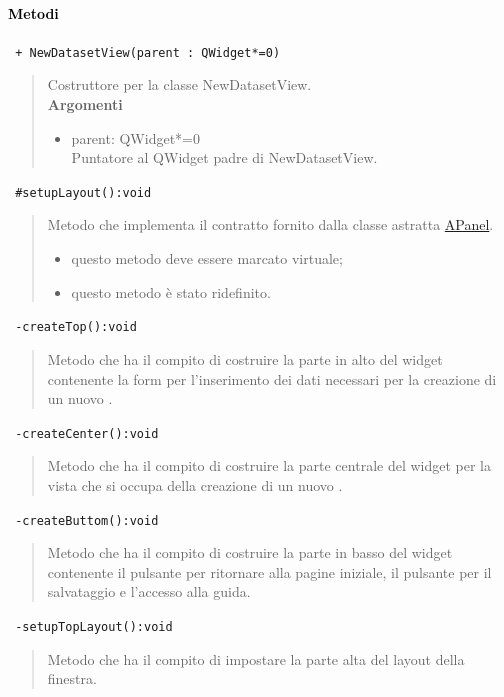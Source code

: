\paragraph{\textcolor{black}{Metodi\\}}
\color{blue}\verb! + NewDatasetView(parent : QWidget*=0)!
\begin{quote}
\color{black}Costruttore per la classe NewDatasetView. \\
\textbf{Argomenti}
\begin{itemize}
\item parent: QWidget*=0  \\ Puntatore al QWidget padre di NewDatasetView.
\end{itemize}
\end{quote}
\color{blue}\verb! #setupLayout():void!
\begin{quote}
\color{black} Metodo che implementa il contratto fornito dalla classe astratta \hyperref[speAPanel]{APanel}.
\begin{itemize}
\item questo metodo deve essere marcato virtuale;
\item questo metodo è stato ridefinito.
\end{itemize}
\end{quote} 
\color{blue}\verb! -createTop():void!
\begin{quote}
\color{black} Metodo che ha il compito di costruire la parte in alto del widget contenente la form per l'inserimento dei dati necessari per la creazione di un nuovo \dataset{}.
\end{quote} 
\color{blue}\verb! -createCenter():void!
\begin{quote}
\color{black} Metodo che ha il compito di costruire la parte centrale del widget per la vista che si occupa della  creazione di un nuovo \dataset{}.
\end{quote} 
\color{blue}\verb! -createButtom():void!
\begin{quote}
\color{black} Metodo che ha il compito di costruire la parte in basso del widget contenente il pulsante per ritornare alla pagine iniziale, il pulsante per il salvataggio e l'accesso alla guida.
\end{quote}
\color{blue}\verb! -setupTopLayout():void!
\begin{quote}
\color{black} Metodo che ha il compito di impostare la parte alta del layout della finestra.
\end{quote}  
